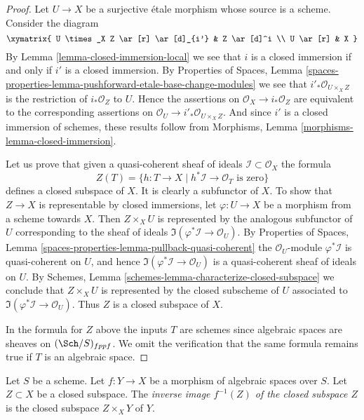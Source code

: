 \begin{proof}
Let $U \to X$ be a surjective \'etale morphism whose source is a scheme.
Consider the diagram
$$
\xymatrix{
U \times_X Z \ar[r] \ar[d]_{i'} & Z \ar[d]^i \\
U \ar[r] & X
}
$$
By
Lemma \ref{lemma-closed-immersion-local}
we see that $i$ is a closed immersion
if and only if $i'$ is a closed immersion. By
Properties of Spaces,
Lemma \ref{spaces-properties-lemma-pushforward-etale-base-change-modules}
we see that $i'_*\mathcal{O}_{U \times_X Z}$ is the restriction of
$i_*\mathcal{O}_Z$ to $U$. Hence the assertions on
$\mathcal{O}_X \to i_*\mathcal{O}_Z$ are equivalent to the
corresponding assertions on
$\mathcal{O}_U \to i'_*\mathcal{O}_{U \times_X Z}$.
And since $i'$ is a closed immersion of schemes, these results follow from
Morphisms, Lemma \ref{morphisms-lemma-closed-immersion}.

\medskip\noindent
Let us prove that given a quasi-coherent
sheaf of ideals $\mathcal{I} \subset \mathcal{O}_X$ the formula
$$
Z(T) = \{h : T \to X \mid h^*\mathcal{I} \to \mathcal{O}_T
\text{ is zero}\}
$$
defines a closed subspace of $X$. It is clearly a subfunctor of $X$.
To show that $Z \to X$ is representable by closed immersions, let
$\varphi : U \to X$ be a morphism from a scheme towards $X$. Then
$Z \times_X U$ is represented by the analogous subfunctor of $U$ corresponding
to the sheaf of ideals $\Im(\varphi^*\mathcal{I} \to \mathcal{O}_U)$. By
Properties of Spaces,
Lemma \ref{spaces-properties-lemma-pullback-quasi-coherent}
the $\mathcal{O}_U$-module $\varphi^*\mathcal{I}$ is quasi-coherent
on $U$, and hence $\Im(\varphi^*\mathcal{I} \to \mathcal{O}_U)$
is a quasi-coherent sheaf of ideals on $U$. By
Schemes, Lemma \ref{schemes-lemma-characterize-closed-subspace}
we conclude that $Z \times_X U$ is represented by the closed subscheme
of $U$ associated to $\Im(\varphi^*\mathcal{I} \to \mathcal{O}_U)$.
Thus $Z$ is a closed subspace of $X$.

\medskip\noindent
In the formula for $Z$ above the inputs $T$ are schemes since algebraic
spaces are sheaves on $(\Sch/S)_{fppf}$. We omit the verification
that the same formula remains true if $T$ is an algebraic space.
\end{proof}

\begin{definition}
\label{definition-inverse-image-closed-subspace}
Let $S$ be a scheme. Let $f : Y \to X$ be a morphism of algebraic spaces
over $S$. Let $Z \subset X$ be a closed subspace. The
{\it inverse image $f^{-1}(Z)$ of the closed subspace $Z$}
is the closed subspace $Z \times_X Y$ of $Y$.
\end{definition}

